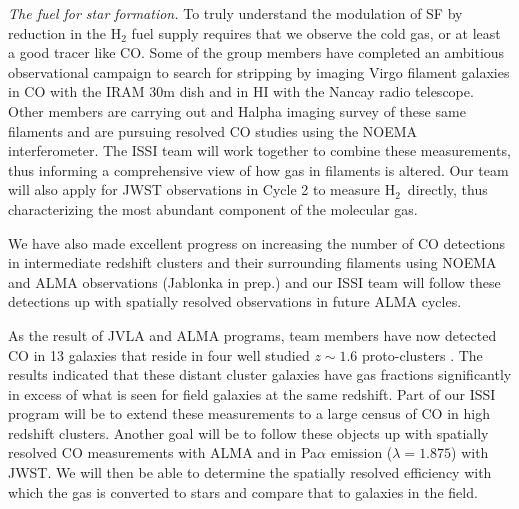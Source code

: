 \documentclass[11pt]{article}
\begin{document}
\textit{The fuel for star formation.} To truly understand the
modulation of SF by reduction in the H$_2$ fuel supply
requires that we observe the cold gas, or at least a good tracer like CO.  
Some of the group members have completed an ambitious observational campaign to search for stripping by imaging Virgo filament galaxies in CO with the IRAM 30m dish and in HI with the Nancay radio telescope.   Other members are carrying out and Halpha imaging survey of these same filaments and are pursuing resolved CO studies using the NOEMA interferometer.  The ISSI team will work together to combine these measurements, thus informing a comprehensive view of how gas in filaments is altered.  Our team will also apply for JWST observations in Cycle 2 to measure H$_2$~directly, thus characterizing the most abundant component of the molecular gas.

We have also made excellent progress on increasing the number of CO detections in intermediate redshift clusters and their surrounding filaments using NOEMA \citep{Jablonka13} and ALMA observations (Jablonka in prep.) and our ISSI team will follow these detections up with spatially resolved observations in future ALMA cycles.  

As the result of JVLA and ALMA programs, team members have now detected CO
in 13 galaxies that reside in four well studied $z\sim 1.6$ proto-clusters
\citep{Rudnick17b,Noble17}.  The results indicated that these distant cluster galaxies have gas fractions significantly in excess of what is seen for field galaxies at the same redshift.  Part of our ISSI program will be to extend these measurements to a large census of CO in high redshift clusters.  Another goal will be to follow these objects up with spatially resolved CO measurements with ALMA and in Pa$\alpha$ emission ($\lambda=1.875$\micron) with JWST.  We will then be able to determine the spatially resolved efficiency with which the gas is converted to stars and compare that to galaxies in the field.
\end{document}
